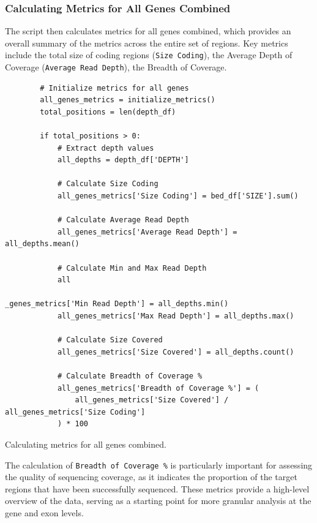 \subsubsection{\textbf{Calculating Metrics for All Genes Combined}}

The script then calculates metrics for all genes combined, which provides an overall summary of the metrics across the entire set of regions. Key metrics include the total size of coding regions (\texttt{Size Coding}), the Average Depth of Coverage (\texttt{Average Read Depth}), the Breadth of Coverage.

\begin{longlisting}
\begin{verbatim}
        # Initialize metrics for all genes
        all_genes_metrics = initialize_metrics()
        total_positions = len(depth_df)

        if total_positions > 0:
            # Extract depth values
            all_depths = depth_df['DEPTH']

            # Calculate Size Coding
            all_genes_metrics['Size Coding'] = bed_df['SIZE'].sum()

            # Calculate Average Read Depth
            all_genes_metrics['Average Read Depth'] = all_depths.mean()
            
            # Calculate Min and Max Read Depth
            all

_genes_metrics['Min Read Depth'] = all_depths.min()
            all_genes_metrics['Max Read Depth'] = all_depths.max()

            # Calculate Size Covered
            all_genes_metrics['Size Covered'] = all_depths.count()

            # Calculate Breadth of Coverage %
            all_genes_metrics['Breadth of Coverage %'] = (
                all_genes_metrics['Size Covered'] / all_genes_metrics['Size Coding']
            ) * 100
\end{verbatim}
\caption{Calculating metrics for all genes combined.}
\label{lbl:metrics_all_genes}
\end{longlisting}

The calculation of \texttt{Breadth of Coverage \%} is particularly important for assessing the quality of sequencing coverage, as it indicates the proportion of the target regions that have been successfully sequenced. These metrics provide a high-level overview of the data, serving as a starting point for more granular analysis at the gene and exon levels.

